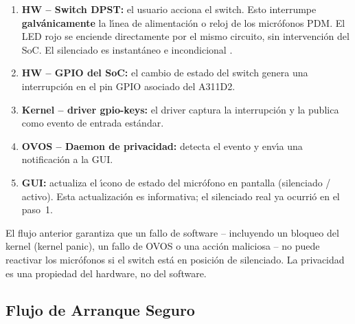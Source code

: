 \begin{enumerate}
  \item \textbf{HW -- Switch DPST:} el usuario acciona el switch. Esto interrumpe
    \textbf{galv\'{a}nicamente} la l\'{\i}nea de alimentaci\'{o}n o reloj
    de los micr\'{o}fonos PDM. El LED rojo se enciende directamente por el
    mismo circuito, sin intervenci\'{o}n del SoC. El silenciado es instant\'{a}neo
    e incondicional .
  \item \textbf{HW -- GPIO del SoC:} el cambio de estado del switch genera
    una interrupci\'{o}n en el pin GPIO asociado del A311D2.
  \item \textbf{Kernel -- driver gpio-keys:} el driver captura la interrupci\'{o}n
    y la publica como evento de entrada est\'{a}ndar.
  \item \textbf{OVOS -- Daemon de privacidad:} detecta el evento y env\'{\i}a
    una notificaci\'{o}n a la GUI.
  \item \textbf{GUI:} actualiza el \'{\i}cono de estado del micr\'{o}fono en
    pantalla (silenciado / activo). Esta actualizaci\'{o}n es informativa;
    el silenciado real ya ocurri\'{o} en el paso~1.
\end{enumerate}

\begin{infobox}
  El flujo anterior garantiza que un fallo de software -- incluyendo un bloqueo
  del kernel (kernel panic), un fallo de OVOS o una acci\'{o}n maliciosa --
  no puede reactivar los micr\'{o}fonos si el switch est\'{a} en posici\'{o}n
  de silenciado. La privacidad es una propiedad del hardware, no del software.
\end{infobox}

\subsection{Flujo de Arranque Seguro}

